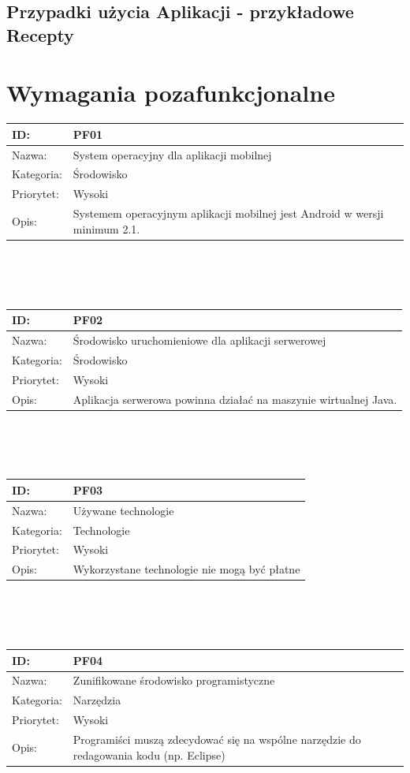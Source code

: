 \documentclass[11pt,a4paper,polish,thesis]{dcsbook}
\begin{document}
\subsection{Przypadki użycia Aplikacji - przykładowe Recepty}
\section{Wymagania pozafunkcjonalne}

\begin{tabular}{|p{2cm}|p{12cm}|}  \hline ID: &
PF01
\\ \hline Nazwa: &
System operacyjny dla aplikacji mobilnej	
\\ \hline Kategoria: &
Środowisko
\\ \hline Priorytet: &
Wysoki
\\ \hline Opis: &
Systemem operacyjnym aplikacji mobilnej jest Android w wersji minimum 2.1.

\\ \hline \end{tabular} \\\\\ \begin{tabular}{|p{2cm}|p{12cm}|}  \hline ID: &
PF02
\\ \hline Nazwa: &
Środowisko uruchomieniowe dla aplikacji serwerowej
\\ \hline Kategoria: &
Środowisko
\\ \hline Priorytet: &
Wysoki
\\ \hline Opis: &
Aplikacja serwerowa powinna działać na maszynie wirtualnej Java.

\\ \hline \end{tabular} \\\\\ \begin{tabular}{|p{2cm}|p{12cm}|}  \hline ID: &
PF03
\\ \hline Nazwa: &
Używane technologie
\\ \hline Kategoria: &
Technologie
\\ \hline Priorytet: &
Wysoki
\\ \hline Opis: &
Wykorzystane technologie nie mogą być płatne

\\ \hline \end{tabular} \\\\\ \begin{tabular}{|p{2cm}|p{12cm}|}  \hline ID: &
PF04
\\ \hline Nazwa: &
Zunifikowane środowisko programistyczne
\\ \hline Kategoria: &
Narzędzia
\\ \hline Priorytet: &
Wysoki
\\ \hline Opis: &
Programiści muszą zdecydować się na wspólne narzędzie do redagowania kodu (np. Eclipse)


\end{tabular}
\end{document}
